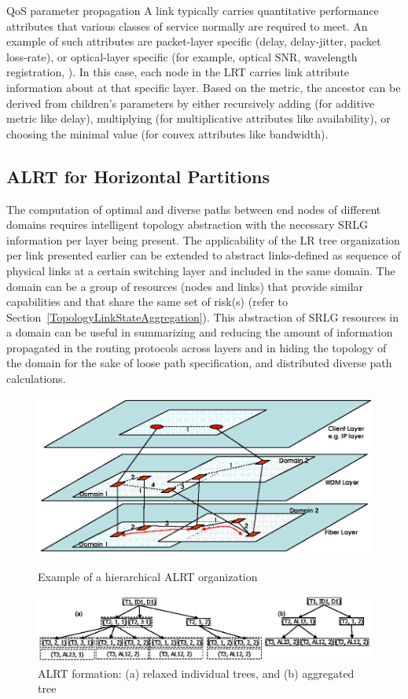 \begin{definition}{QoS parameter propagation} A link typically carries quantitative performance attributes that various classes of service normally are required to meet. An example of such attributes are packet-layer specific (\eg delay, delay-jitter, packet loss-rate), or optical-layer specific (for example, optical SNR, wavelength registration, \etc). In this case, each node in the LRT carries link attribute information about at that specific layer. Based on the metric, the ancestor can be derived from children's parameters by either recursively adding (\eg for additive metric like delay), multiplying (\eg for multiplicative attributes like availability), or choosing the minimal value (\eg for convex attributes like bandwidth).
\end{definition}

\subsection{ALRT for Horizontal Partitions}
The computation of optimal and diverse paths between end nodes of different domains requires intelligent topology abstraction with the necessary SRLG information per layer being present. The applicability of the LR tree organization per link presented earlier can be extended to abstract links-defined as sequence of physical links at a certain switching layer and included in the same domain. The domain can be a group of resources (nodes and links) that provide similar capabilities and that share the same set of risk(s) (refer to Section~\ref{TopologyLinkStateAggregation}). This abstraction of SRLG resources in a domain can be useful in summarizing and reducing the amount of information propagated in the routing protocols across layers and in hiding the topology of the domain for the sake of loose path specification, and distributed diverse path calculations.

\begin{figure}
\centering
\includegraphics[clip]{Figures/ALRT1.eps}
\caption{Example of a hierarchical ALRT organization}
\label{fig:ALRT1}
\hfill
\centering
\includegraphics[clip]{Figures/ALRT2.eps}
\caption[ALRT formation]
{ALRT formation: (a) relaxed individual trees, and (b) aggregated tree}
\label{fig:ALRT2}
\end{figure}

